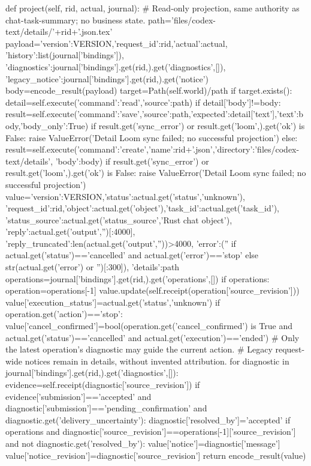     def project(self, rid, actual, journal):
        # Read-only projection, same authority as chat-task-summary; no business state.
        path='files/codex-text/details/'+rid+'.json.tex'
        payload={'version':VERSION,'request_id':rid,'actual':actual,
                 'history':list(journal['bindings']),
                 'diagnostics':journal['bindings'].get(rid,{}).get('diagnostics',[]),
                 'legacy_notice':journal['bindings'].get(rid,{}).get('notice')}
        body=encode_result(payload)
        target=Path(self.world)/path
        if target.exists():
            detail=self.execute({'command':'read','source':path})
            if detail['body']!=body:
                result=self.execute({'command':'save','source':path,'expected':detail['text'],'text':body,'body_only':True})
                if result.get('sync_error') or result.get('loom',{}).get('ok') is False:
                    raise ValueError('Detail Loom sync failed; no successful projection')
        else:
            result=self.execute({'command':'create','name':rid+'.json','directory':'files/codex-text/details',
                          'body':body})
            if result.get('sync_error') or result.get('loom',{}).get('ok') is False:
                raise ValueError('Detail Loom sync failed; no successful projection')
        value={'version':VERSION,'status':actual.get('status','unknown'),
               'request_id':rid,'object':actual.get('object'),'task_id':actual.get('task_id'),
               'status_source':actual.get('status_source','Rust chat object'),
               'reply':actual.get('output','')[:4000],
               'reply_truncated':len(actual.get('output',''))>4000,
               'error':('' if actual.get('status')=='cancelled' and actual.get('error')=='stop'
                        else str(actual.get('error') or '')[:300]), 'details':path}
        operations=journal['bindings'].get(rid,{}).get('operations',[])
        if operations:
            operation=operations[-1]
            value.update(self.receipt(operation['source_revision']))
            value['execution_status']=actual.get('status','unknown')
            if operation.get('action')=='stop':
                value['cancel_confirmed']=bool(operation.get('cancel_confirmed') is True
                    and actual.get('status')=='cancelled' and actual.get('execution')=='ended')
        # Only the latest operation's diagnostic may guide the current action.
        # Legacy request-wide notices remain in details, without invented attribution.
        for diagnostic in journal['bindings'].get(rid,{}).get('diagnostics',[]):
            evidence=self.receipt(diagnostic['source_revision'])
            if evidence['submission']=='accepted' and diagnostic['submission']=='pending_confirmation' and diagnostic.get('delivery_uncertainty'):
                diagnostic['resolved_by']='accepted'
            if operations and diagnostic['source_revision']==operations[-1]['source_revision'] and not diagnostic.get('resolved_by'):
                value['notice']=diagnostic['message']
                value['notice_revision']=diagnostic['source_revision']
        return encode_result(value)

